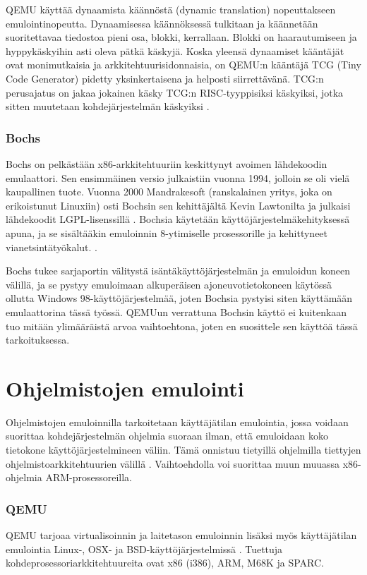 QEMU käyttää dynaamista käännöstä (dynamic translation) nopeuttakseen emulointinopeutta. Dynaamisessa käännöksessä tulkitaan ja käännetään suoritettavaa tiedostoa pieni osa, blokki, kerrallaan. Blokki on haarautumiseen ja hyppykäskyihin asti oleva pätkä käskyjä. Koska yleensä dynaamiset kääntäjät ovat monimutkaisia ja arkkitehtuurisidonnaisia, on QEMU:n kääntäjä TCG (Tiny Code Generator) pidetty yksinkertaisena ja helposti siirrettävänä. TCG:n perusajatus on jakaa jokainen käsky TCG:n RISC-tyyppisiksi käskyiksi, jotka sitten muutetaan kohdejärjestelmän käskyiksi \cite{qemu_tech}.


\subsubsection{Bochs}
Bochs on pelkästään x86-arkkitehtuuriin keskittynyt avoimen lähdekoodin emulaattori. Sen ensimmäinen versio julkaistiin vuonna 1994, jolloin se oli vielä kaupallinen tuote. Vuonna 2000 Mandrakesoft (ranskalainen yritys, joka on erikoistunut Linuxiin) osti Bochsin sen kehittäjältä Kevin Lawtonilta ja julkaisi lähdekoodit LGPL-lisenssillä \cite{bochs0}. Bochsia käytetään käyttöjärjestelmäkehityksessä apuna, ja se sisältääkin emuloinnin 8-ytimiselle prosessorille ja kehittyneet vianetsintätyökalut. \cite{bochs_doc}.

Bochs tukee sarjaportin välitystä isäntäkäyttöjärjestelmän ja emuloidun koneen välillä, ja se pystyy emuloimaan alkuperäisen ajoneuvotietokoneen käytössä ollutta Windows 98-käyttöjärjestelmää, joten Bochsia pystyisi siten käyttämään emulaattorina tässä työssä. QEMUun verrattuna Bochsin käyttö ei kuitenkaan tuo mitään ylimääräistä arvoa vaihtoehtona, joten en suosittele sen käyttöä tässä tarkoituksessa.


\section{Ohjelmistojen emulointi}
Ohjelmistojen emuloinnilla tarkoitetaan käyttäjätilan emulointia, jossa voidaan suorittaa kohdejärjestelmän ohjelmia suoraan ilman, että emuloidaan koko tietokone käyttöjärjestelmineen väliin. Tämä onnistuu tietyillä ohjelmilla tiettyjen ohjelmistoarkkitehtuurien välillä \cite{tinycc, qemu_use}. Vaihtoehdolla voi suorittaa muun muuassa x86-ohjelmia ARM-prosessoreilla.

\subsubsection{QEMU}
QEMU tarjoaa virtualisoinnin ja laitetason emuloinnin lisäksi myös käyttäjätilan emulointia Linux-, OSX- ja BSD-käyttöjärjestelmissä \cite{qemu_use}. Tuettuja kohdeprosessoriarkkitehtuureita ovat x86 (i386), ARM, M68K ja SPARC.

